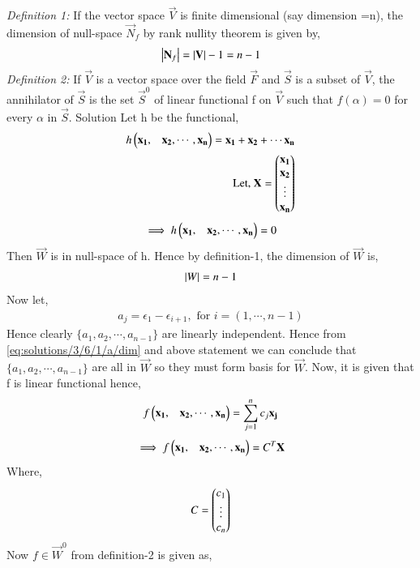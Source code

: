 {\em Definition 1: }
If the vector space $\vec{V}$ is finite dimensional (say dimension =n), the dimension of null-space $\vec{N}_f$ by rank nullity theorem is given by,
\begin{align}
\left\vert\mathbf{N}_f\right\vert  = \left\vert\mathbf{V}\right\vert - 1 = n - 1
\end{align}  
{\em Definition 2: }
If $\vec{V}$ is a vector space over the field $\vec{F}$ and $\vec{S}$ is a subset of $\vec{V}$, the annihilator of $\vec{S}$ is the set $\vec{S}^0$ of linear functional f on $\vec{V}$ such that $f(\alpha) = 0$ for every $\alpha$ in $\vec{S}$. 
{Solution}
Let h be the functional,
\begin{align}
h\begin{pmatrix}\mathbf{x_1},&\mathbf{x_2},\cdots ,\mathbf{x_n}\end{pmatrix} = \mathbf{x_1}+\mathbf{x_2}+\cdots \mathbf{x_n}\\
\mbox{Let, } \mathbf{X} = \begin{pmatrix}\mathbf{x_1}\\\mathbf{x_2}\\\vdots\\\mathbf{x_n}\end{pmatrix}
\end{align}
\begin{align}
\implies h\begin{pmatrix}\mathbf{x_1},&\mathbf{x_2},\cdots ,\mathbf{x_n}\end{pmatrix} = 0
\end{align}
Then $\vec{W}$ is in null-space of h. Hence by definition-1, the dimension of $\vec{W}$ is,
\begin{align}
\left\vert W\right\vert = n - 1
\label{eq:solutions/3/6/1/a/dim}
\end{align}
Now let, 
\begin{align}
a_j = \epsilon_1-\epsilon_{i+1}, \mbox{ for } i = (1,\cdots ,n-1)
\label{eq:solutions/3/6/1/a/aj} 
\end{align}
Hence clearly $\{a_1, a_2, \cdots, a_{n-1}\}$ are linearly independent. Hence from \eqref{eq:solutions/3/6/1/a/dim} and above statement we can conclude that $\{a_1, a_2, \cdots, a_{n-1}\}$ are all in $\vec{W}$ so they must form basis for $\vec{W}$. Now, it is given that f is linear functional hence,
\begin{align}
f\begin{pmatrix}\mathbf{x_1},&\mathbf{x_2},\cdots ,\mathbf{x_n}\end{pmatrix} = \sum_{j=1}^{n}c_j\mathbf{x_j}
\end{align}
\begin{align}
\implies f\begin{pmatrix}\mathbf{x_1},&\mathbf{x_2},\cdots ,\mathbf{x_n}\end{pmatrix} = C^T\mathbf{X}
\end{align}
Where,
\begin{align}
C = \begin{pmatrix}c_1\\\vdots\\c_n\end{pmatrix}
\end{align}
Now $f \in \vec{W}^0$ from definition-2 is given as,
